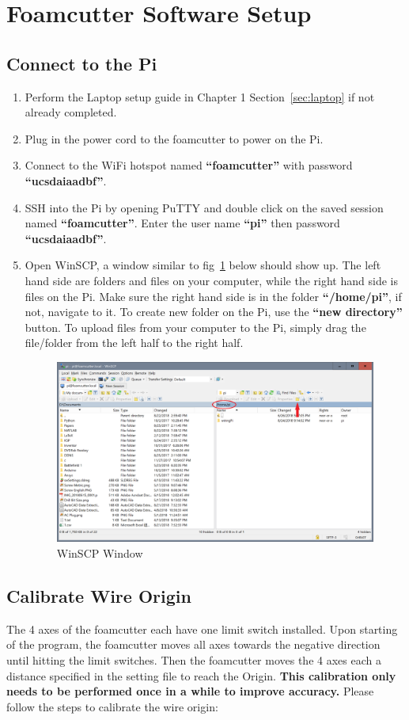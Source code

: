 \documentclass[titlepage,12pt,letter]{report}
\numberwithin{equation}{chapter}
\begin{document}
\section{Foamcutter Software Setup}
\subsection{Connect to the Pi}
\begin{enumerate}[noitemsep,topsep=0pt]
	\item Perform the Laptop setup guide in Chapter 1 Section~\ref{sec:laptop} if not already completed.
	\item Plug in the power cord to the foamcutter to power on the Pi.
	\item Connect to the WiFi hotspot named \textbf{``foamcutter''} with password \textbf{``ucsdaiaadbf''}.
	\item SSH into the Pi by opening PuTTY and double click on the saved session named \textbf{``foamcutter''}. Enter the user name \textbf{``pi''} then password \textbf{``ucsdaiaadbf''}.
	\item Open WinSCP, a window similar to fig~\ref{fig:winscp} below should show up. The left hand side are folders and files on your computer, while the right hand side is files on the Pi. Make sure the right hand side is in the folder \textbf{``/home/pi''}, if not, navigate to it. To create new folder on the Pi, use the \textbf{``new directory''} button. To upload files from your computer to the Pi, simply drag the file/folder from the left half to the right half. 
	\begin{figure} [H]
		\includegraphics[width = 0.9\linewidth]{./Figures/winscp.png}
		\caption{WinSCP Window}
		\label{fig:winscp}
	\end{figure}
\end{enumerate}

\subsection{Calibrate Wire Origin}
\label{sec:calibration}
The 4 axes of the foamcutter each have one limit switch installed. Upon starting of the program, the foamcutter moves all axes towards the negative direction until hitting the limit switches. Then the foamcutter moves the 4 axes each a distance specified in the setting file to reach the Origin. \textbf{This calibration only needs to be performed once in a while to improve accuracy.} Please follow the  steps to calibrate the wire origin:
\end{document}
